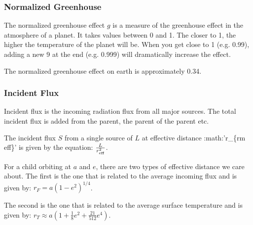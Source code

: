 \documentclass[letterpaper,10pt,english]{sphinxmanual}
\begin{document}
\subsubsection{Normalized Greenhouse}
\label{\detokenize{quantities/surface/emission/normalized_greenhouse:normalized-greenhouse}}\label{\detokenize{quantities/surface/emission/normalized_greenhouse::doc}}\label{\detokenize{quantities/surface/emission/normalized_greenhouse:id1}}
\sphinxAtStartPar
The normalized greenhouse effect \(g\) is a measure of the greenhouse effect in the atmosphere of a planet.
It takes values between 0 and 1. The closer to 1, the higher the temperature of the planet will be.
When you get close to 1 (e.g. 0.99), adding a new 9 at the end (e.g. 0.999) will dramatically increase the effect.

\sphinxAtStartPar
The normalized greenhouse effect on earth is approximately 0.34.


\subsubsection{Incident Flux}
\label{\detokenize{quantities/surface/emission/incident_flux:incident-flux}}\label{\detokenize{quantities/surface/emission/incident_flux::doc}}\label{\detokenize{quantities/surface/emission/incident_flux:id1}}
\sphinxAtStartPar
Incident flux is the incoming radiation flux from all major sources.
The total incident flux is added from the parent, the parent of the parent
etc.

\sphinxAtStartPar
The incident flux \(S\) from a single source of {\hyperref[\detokenize{quantities/surface/emission/luminosity:id1}]{}} \(L\)
at effective distance :math:’r\_\{rm eff\}’ is given by the equation: \(\frac{L}{r_{\rm eff}^2}\).

\sphinxAtStartPar
For a child orbiting at {\hyperref[\detokenize{quantities/orbital/semi_major_axis:id1}]{}} \(a\)
and {\hyperref[\detokenize{quantities/orbital/eccentricity:id1}]{}} \(e\),
there are two types of effective distance we care about.
The first is the one that is related to the average incoming flux and is given by:
\(r_F = a \left(1 - e^2\right)^{1/4}\).

\sphinxAtStartPar
The second is the one that is related to the average surface temperature and is given by:
\(r_T \approx a (1 + \frac{1}{8} e^2 + \frac{21}{512} e^4)\).
\end{document}
